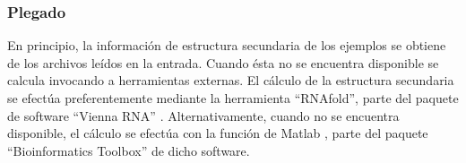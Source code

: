 %
\subsubsection{Plegado}
%
En principio, la información de estructura secundaria de los ejemplos
se obtiene de los archivos leídos en la entrada.
Cuando ésta no se encuentra disponible se calcula invocando a
herramientas externas.
El cálculo de la estructura secundaria se efectúa preferentemente mediante
la herramienta ``RNAfold'', parte del paquete de software ``Vienna RNA''
\cite{vienna}.
Alternativamente, cuando  no se encuentra disponible, el
cálculo se efectúa con la función de Matlab , parte del
paquete ``Bioinformatics Toolbox'' de dicho software.
